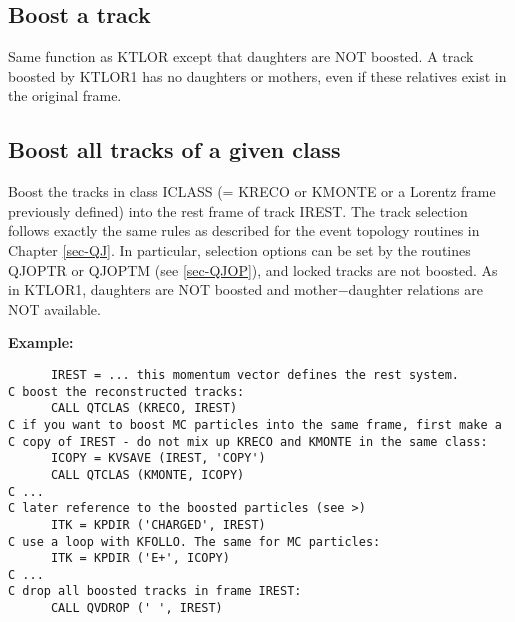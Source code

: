 \subsection{\label{sec-QT1}Boost a track}
\par
{}
\par
Same function as KTLOR except that daughters are NOT boosted. A track
boosted by KTLOR1 has no daughters or mothers, even if these
relatives exist in the original frame.
 
\subsection{\label{sec-QTC}Boost all tracks of a given class}
\par
{}
\par
\par
Boost the tracks in class ICLASS (= KRECO or KMONTE or a Lorentz
frame previously defined) into the rest frame of track IREST.
The track selection
follows exactly the same rules as described for the event topology
routines in Chapter \ref{sec-QJ}.
In particular,
selection options can be set by the routines QJOPTR or QJOPTM
(see \ref{sec-QJOP}), and locked tracks are not boosted.
As in KTLOR1, daughters are NOT boosted
and mother$-$daughter relations are NOT available.
\par {\bf Example:}
\begin{verbatim}
      IREST = ... this momentum vector defines the rest system.
C boost the reconstructed tracks:
      CALL QTCLAS (KRECO, IREST)
C if you want to boost MC particles into the same frame, first make a
C copy of IREST - do not mix up KRECO and KMONTE in the same class:
      ICOPY = KVSAVE (IREST, 'COPY')
      CALL QTCLAS (KMONTE, ICOPY)
C ...
C later reference to the boosted particles (see >)
      ITK = KPDIR ('CHARGED', IREST)
C use a loop with KFOLLO. The same for MC particles:
      ITK = KPDIR ('E+', ICOPY)
C ...
C drop all boosted tracks in frame IREST:
      CALL QVDROP (' ', IREST)
\end{verbatim}
